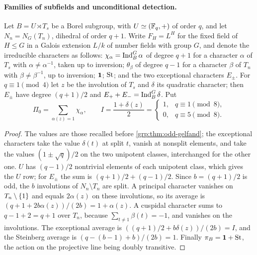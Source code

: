\paragraph{Families of subfields and unconditional detection.}
Let $B=U\rtimes T_s$ be a Borel subgroup, with $U\simeq(\mathbb{F}_q,+)$ of order $q$, and let
$N_n=N_G(T_n)$, dihedral of order $q+1$. Write $F_H=L^H$ for the fixed field of $H\le G$ in a
Galois extension $L/k$ of number fields with group $G$, and denote the irreducible
characters as follows: $\chi_\alpha=\operatorname{Ind}_B^G\alpha$ of degree $q+1$ for a character $\alpha$ of
$T_s$ with $\alpha\ne\alpha^{-1}$, taken up to inversion; $\theta_\beta$ of degree $q-1$ for a
character $\beta$ of $T_n$ with $\beta\ne\beta^{-1}$, up to inversion; $\mathbf{1}$; $\mathrm{St}$; and the
two exceptional characters $E_\pm$. For $q\equiv1\pmod4$ let $z$ be the involution of $T_s$ and
$\delta$ its quadratic character; then $E_\pm$ have degree $(q+1)/2$ and
$E_++E_-=\operatorname{Ind}_B^G\delta$. Put
\[
 \Pi_0=\sum_{\alpha(z)=1}\chi_\alpha,\qquad
 I=\frac{1+\delta(z)}2=\begin{cases}1,&q\equiv1\pmod8,\\0,&q\equiv5\pmod8.\end{cases}
\]

\begin{proof}
The values are those recalled before \cref{grp:thm:odd-gelfand}; the exceptional
characters take the value $\delta(t)$ at split $t$, vanish at nonsplit elements, and take the
values $(1\pm\sqrt q)/2$ on the two unipotent classes, interchanged for the other one. $U$ has
$(q-1)/2$ nontrivial elements of each unipotent class, which gives the $U$ row; for $E_\pm$ the
sum is $(q+1)/2+(q-1)/2$. Since $b=(q+1)/2$ is odd, the $b$ involutions of $N_n\setminus T_n$ are
split. A principal character vanishes on $T_n\setminus\{1\}$ and equals $2\alpha(z)$ on these
involutions, so its average is $(q+1+2b\alpha(z))/(2b)=1+\alpha(z)$. A cuspidal character sums to
$q-1+2=q+1$ over $T_n$, because $\sum_{t\ne1}\beta(t)=-1$, and vanishes on the involutions. The
exceptional average is $((q+1)/2+b\delta(z))/(2b)=I$, and the Steinberg average is
$(q-(b-1)+b)/(2b)=1$. Finally $\pi_B=\mathbf{1}+\mathrm{St}$, the action on the projective line being
doubly transitive.
\end{proof}

